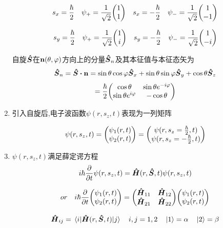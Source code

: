 \documentclass{article}
\begin{document}
\begin{formal}
\begin{enumerate}
                  $$ 
                  s_{x} = \frac{\hbar}{2} \quad \psi_{+} = \frac{1}{\sqrt{2}} \mqty(1 \\ 1) \quad 
                  s_{x} = -\frac{\hbar}{2} \quad \psi_{-} = \frac{1}{\sqrt{2}} \mqty(1 \\ -1)
                  $$

                  $$ 
                  s_{y} = \frac{\hbar}{2} \quad \psi_{+} = \frac{1}{\sqrt{2}} \mqty(1 \\ i) \quad 
                  s_{y} = -\frac{\hbar}{2} \quad \psi_{-} = \frac{1}{\sqrt{2}} \mqty(1 \\ -i)
                  $$

                  自旋$\vu*{S}$在$\vb{n}(\theta,\varphi)$方向上的分量$\vu*{S}_{n}$及其本征值与本征态矢为
                  $$ 
                  \vu*{S}_{n} = \vb{\vu*{S}} \vdot \vb{n} = 
                  \sin{\theta} \cos{\varphi} \vu*{S}_{x} + \sin{\theta}\sin{\varphi} \vu*{S}_{y} + \cos{\theta}\vu*{S}_{z}
                  $$
                  $$
                  = \frac{\hbar}{2} \mqty(\cos{\theta} & \sin{\theta}e^{-i\varphi} \\ \sin{\theta}e^{i\varphi} & -\cos{\theta}   )
                  $$

            \item 引入自旋后,电子波函数$\psi(r,s_{z},t)$表现为一列矩阵
            
                  $$ 
                  \psi(r,s_{z},t) = \mqty(\psi_{1}(r,t) \\ \psi_{2}(r,t) ) = 
                  \mqty(\psi(r,s_{z} = \frac{\hbar}{2},t) \\ \psi(r,s_{z} = -\frac{\hbar}{2},t) ) 
                  $$

            \item $\psi(r,s_{z},t)$满足薛定谔方程
                  $$ i\hbar\pdv{}{t} \psi(r,s_{z},t) = \vu*{H}(r,\vu*{S},t)\psi(r,s_{z},t) $$
                  
                  $$ 
                  or \quad i\hbar \pdv{t} \mqty(\psi_{1}(r,t) \\ \psi_{2}(r,t)) = 
                  \mqty(\vu*{H}_{11} & \vu*{H}_{12} \\ \vu*{H}_{21} & \vu*{H}_{22} ) \mqty(\psi_{1}(r,t) \\ \psi_{2}(r,t))
                  $$
                  
                  $$
                  \vu*{H}_{ij} = \mel{i}{\vu*{H}(r,\vu*{S},t)}{j} \quad i,j = 1,2 \quad \ket{1} = \alpha \quad \ket{2} = \beta
                  $$


\end{enumerate}
\end{formal}
\end{document}

